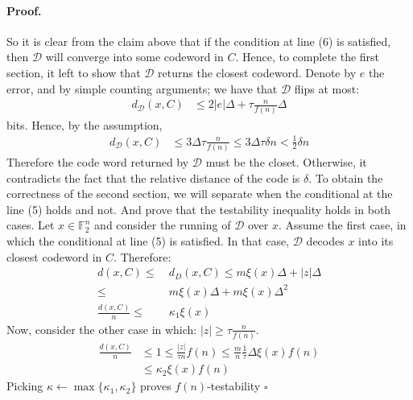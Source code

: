 \documentclass{article}
\begin{document}
\begin{multicols*}{2}
  \paragraph{Proof.} So it is clear from the claim above that if the condition at line (6) is satisfied, then $\mathcal{D}$  will converge into some codeword in $C$. Hence, to complete the first section, it left to show that $\mathcal{D}$ returns the closest codeword. Denote by $e$ the error, and by simple counting arguments; we have that $\mathcal{D}$ flips at most:  
  \begin{equation*}
    \begin{split}
      d_{\mathcal{D}}\left( x, C \right) & \le 2|e|\Delta + \tau \frac{n}{f\left( n \right)}\Delta
    \end{split}
  \end{equation*}
  bits. Hence, by the assumption, 
  \begin{equation*}
    \begin{split}
      d_{\mathcal{D}}\left( x, C \right) & \le 3\Delta \tau \frac{n}{f\left( n \right)} \le 3\Delta \tau\delta n < \frac{1}{2} \delta n  
    \end{split}
  \end{equation*}
  Therefore the code word returned by $\mathcal{D}$ must be the closet. Otherwise, it contradicts the fact that the relative distance of the code is $\delta$.
  To obtain the correctness of the second section, we will separate when the conditional at the line (5) holds and not. And prove that the testability inequality holds in both cases. 
  Let $x \in \mathbb{F}_{2}^{n}$ and consider the running of $\mathcal{D}$ over $x$. Assume the first case, in which the conditional at line (5) is satisfied. In that case, $\mathcal{D}$ decodes $x$ into its closest codeword in $C$. Therefore:
  \begin{equation*}
    \begin{split}
      d\left( x, C \right) \le & \ d_{D} \left( x, C \right) \le m\xi\left( x \right)\Delta +  |z|\Delta  \\ \le &  \  m\xi\left( x \right)\Delta + m\xi\left( x \right)  \Delta^{2} \\ 
      \frac{d\left( x, C \right)}{n} \le & \  \kappa_{1} \xi\left( x \right)    
    \end{split}
  \end{equation*}
  Now, consider the other case in which: $ |z| \ge \tau \frac{n}{f\left( n \right)}  $.
  \begin{equation*}
    \begin{split}
      \frac{d\left( x, C \right)}{n} & \le 1 \le \frac{|z|}{\tau n}f\left( n \right) \le \frac{m}{n} \frac{1}{\tau} \Delta \xi\left( x\right)f\left( n \right) \\ & \le \kappa_{2} \xi\left( x \right)f\left( n \right)  
    \end{split}
  \end{equation*}
  Picking $ \kappa \leftarrow \max \{ \kappa_{1}, \kappa_{2} \}$ proves $f\left( n \right)$-testability $\square$
\end{multicols*}
\printbibliography 
\end{document}
